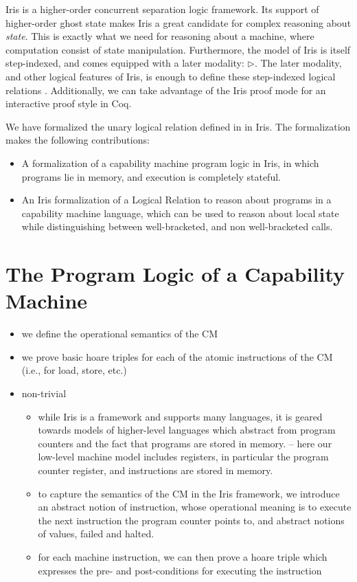\documentclass[sigplan,review]{acmart}\settopmatter{printfolios=true,printccs=false,printacmref=false}
\begin{document}
Iris is a higher-order concurrent separation logic framework. Its support of higher-order ghost state makes Iris a great candidate for complex reasoning about \textit{state}. This is exactly what we need for reasoning about a machine, where computation consist of state manipulation. Furthermore, the model of Iris is itself step-indexed, and comes equipped with a later modality: $\triangleright$. The later modality, and other logical features of Iris, is enough to define these step-indexed logical relations\cite{Timany:2017} \cite{Jung:2017} \cite{timany2019}. Additionally, we can take advantage of the Iris proof mode \cite{Krebbers:2017} for an interactive proof style in Coq. 

We have formalized the unary logical relation defined in \cite{skorstengaardESOP18} in Iris. The formalization makes the following contributions: 
\begin{itemize}
	\item A formalization of a capability machine program logic in Iris, in which programs lie in memory, and execution is completely stateful. 
	\item An Iris formalization of a Logical Relation to reason about programs in a capability machine language, which can be used to reason about local state while distinguishing between well-bracketed, and non well-bracketed calls.
\end{itemize} 


\section{The Program Logic of a Capability Machine}

\begin{itemize}
\item we define the operational semantics of the CM
\item we prove basic hoare triples for each of the atomic instructions
  of the CM (i.e., for load, store, etc.)
\item non-trivial
  \begin{itemize}
  \item while Iris is a framework and supports many languages, it is
    geared towards models of higher-level languages which abstract from
    program counters and the fact that programs are stored in memory.
    -- here our low-level machine model includes registers, in particular
    the program counter register, and instructions are stored in memory.
  \item to capture the semantics of the CM in the Iris framework, 
    we introduce an abstract notion of instruction, whose
    operational meaning is to execute the next instruction the program counter
    points to, and abstract notions of values, failed and halted.
  \item for each machine instruction, we can then prove a hoare triple
    which expresses the pre- and post-conditions for executing the instruction
  \end{itemize}
\end{itemize}
\end{document}
